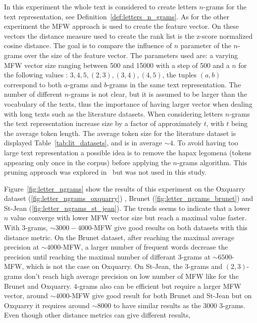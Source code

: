 In this experiment the whole text is considered to create letters $n$-grams for the text representation, see Definition~\ref{def:letters_n_grams}.
As for the other experiment the MFW approach is used to create the feature vector.
On these vectors the distance measure used to create the rank list is the z-score normalized cosine distance.
The goal is to compare the influence of $n$ parameter of the $n$-grams over the size of the feature vector.
The parameters used are: a varying MFW vector size ranging between 500 and 15000 with a step of 500 and a $n$ for the following values : $3, 4, 5, (2, 3), (3, 4), (4, 5)$, the tuples $(a, b)$ correspond to both $a$-grams and $b$-grams in the same text representation.
The number of different $n$-grams is not clear, but it is assumed to be larger than the vocabulary of the texts, thus the importance of having larger vector when dealing with long texts such as the literature datasets.
When considering letters $n$-grams the text representation increase size by a factor of approximately $t$, with $t$ being the average token length.
The average token size for the literature dataset is displayed Table~\ref{tab:lit_datasets}, and is in average $\sim 4$.
To avoid having too large text representation a possible idea is to remove the hapax legomena (tokens appearing only once in the corpus) before applying the $n$-grams algorithm.
This pruning approach was explored in~\cite{kocher_linking} but was not used in this study.

Figure~\ref{fig:letter_ngrams} show the results of this experiment on the Oxquarry dataset (\ref{fig:letter_ngrams_oxquarry}) , Brunet (\ref{fig:letter_ngrams_brunet}) and St-Jean (\ref{fig:letter_ngrams_st_jean}).
The trends seems to indicate that a lower $n$ value converge with lower MFW vector size but reach a maximal value faster.
With $3$-grams, $\sim 3000-4000$-MFW give good results on both datasets with this distance metric.
On the Brunet dataset, after reaching the maximal average precision at $\sim 4000$-MFW, a larger number of frequent words decrease the precision until reaching the maximal number of differant $3$-grams at $\sim 6500$-MFW, which is not the case on Oxquarry.
On St-Jean, the $3$-grams and $(2,3)$-grams don't reach high average precision on low number of MFW like for the Brunet and Oxquarry.
$4$-grams also can be efficient but require a larger MFW vector, around $\sim 4000$-MFW give good result for both Brunet and St-Jean but on Oxquarry it requires around $\sim 8000$ to have similar results as the $3000$ $3$-grams.
Even though other distance metrics can give different results,

